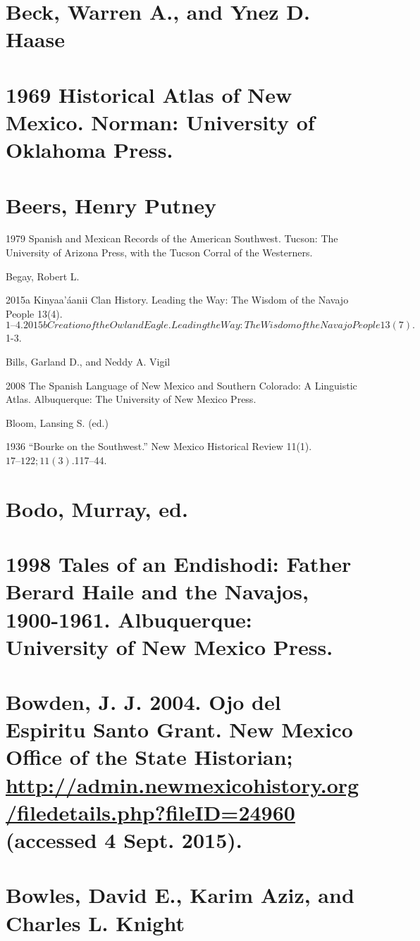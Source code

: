 \section{Beck, Warren A., and Ynez D. Haase}
\section{1969  Historical Atlas of New Mexico.  Norman:  University of Oklahoma Press.}
\section{Beers, Henry Putney}

1979  Spanish and Mexican Records of the American Southwest.  Tucson:  The University of Arizona Press, with the Tucson Corral of the Westerners.

Begay, Robert L.

2015a  Kinyaa’áanii Clan History.  Leading the Way: The Wisdom of the Navajo People 13(4). $1–4.

2015b  Creation of the Owl and Eagle.  Leading the Way: The Wisdom of the Navajo People 13(7). $1-3.

Bills, Garland D., and Neddy A. Vigil

2008  The Spanish Language of New Mexico and Southern Colorado: A Linguistic Atlas.  Albuquerque:  The University of New Mexico Press.

Bloom, Lansing S. (ed.)  

1936  “Bourke on the Southwest.”  New Mexico Historical Review 11(1). $17–122; 11(3). $117–44.

\section{Bodo, Murray, ed.}
\section{1998  Tales of an Endishodi: Father Berard Haile and the Navajos, 1900-1961.  Albuquerque:  University of New Mexico Press.}
\section{Bowden, J. J.  2004.  Ojo del Espiritu Santo Grant.  New Mexico Office of the State Historian; \url{http://admin.newmexicohistory.org/filedetails.php?fileID=24960} (accessed 4 Sept. 2015).}
\section{Bowles, David E., Karim Aziz, and Charles L. Knight}
